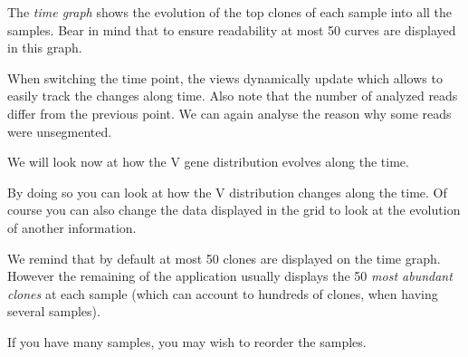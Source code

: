 \documentclass[11pt]{article}
\begin{document}
\label{sec:tracking}

The \textit{time graph} shows the evolution of the top clones of each sample into all the samples.
Bear in mind that to ensure readability at most 50 curves are displayed in this graph.



When switching the time point, the views dynamically update which allows to
easily track the changes along time. Also note that the number of analyzed
reads differ from the previous point. We can again analyse the reason why some
reads were unsegmented.

\bigskip

We will look now at how the V gene distribution evolves along the time.

By doing so you can look at how the V distribution changes along the time.
Of course you can also change the data displayed in the grid to look at
the evolution of another information.

\bigskip

We remind that by default at most 50 clones are displayed
on the time graph. However the remaining of the application usually displays
the 50 \textit{most abundant clones} at each sample (which can account to hundreds of
clones, when having several samples).


\bigskip

If you have many samples, you may wish to reorder the samples.




\bigskip
\end{document}
